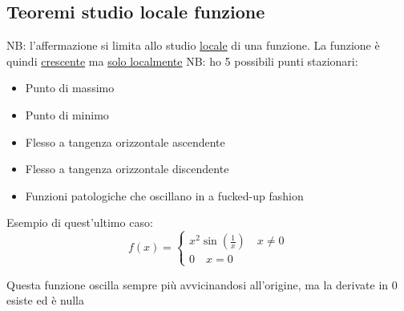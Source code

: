 \subsection{Teoremi studio locale funzione}
NB: l'affermazione si limita allo studio \underline{locale} di una funzione. La funzione è quindi \underline{crescente} ma \underline{solo localmente}
NB: ho 5 possibili punti stazionari:
	\begin{itemize}
		\item Punto di massimo
		\item Punto di minimo
		\item Flesso a tangenza orizzontale ascendente
		\item Flesso a tangenza orizzontale discendente
		\item Funzioni patologiche che oscillano in a fucked-up fashion
	\end{itemize}
Esempio di quest'ultimo caso:
\[
f\left( x \right)  =
\begin{cases}
	x^2 \sin \left( \frac{1}{x} \right) \quad x \neq 0	\\
	0 \quad x=0
\end{cases}
\] 
\begin{center}
\end{center}
Questa funzione oscilla sempre più avvicinandosi all'origine, ma la derivate in 0 esiste ed è nulla
